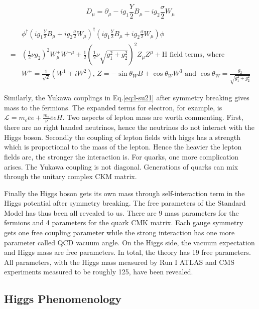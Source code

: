 \begin{equation}
 D_{\mu}  = \partial_{\mu}-ig_1\frac{Y}{2}B_{\mu} - ig_2\frac{\sigma}{2}W_{\mu}
  \label{eq:SU2U1D}
\end{equation}


\begin{equation}
  \begin{split}
   &\phi^{\dagger}(ig_1\frac{Y}{2}B_{\mu}+ig_2\frac{\sigma}{2}W_{\mu})^{\dagger} (ig_1\frac{Y}{2}B_{\mu}+ig_2\frac{\sigma}{2}W_{\mu}) \phi  \\
   =& (\frac{1}{2}\nu g_2)^2 W_{\mu}^+W^{-\mu} + \frac{1}{2}(\frac{1}{2}\nu \sqrt{g_1^2+g_2^2})^2 Z_{\mu}Z^{\mu} + \text{H field terms, where}\\
   &W^{\pm} = \frac{1}{\sqrt{2}}(W^1\mp iW^2) \text{, } Z = -\sin{\theta_W}B+\cos{\theta_W}W^3 \text{ and } \cos{\theta_W} = \frac{g_2}{\sqrt{g^2_1+g^2_2}}
  \end{split}
  \label{eq:SU2U1cov}
\end{equation}


Similarly, the Yukawa couplings in Eq.\ref{eq:l-su21} after symmetry breaking gives mass to the fermions. The expanded terms for electron, for example, is $\mathcal{L} = m_e\bar{e} e + \frac{m_{e}}{\nu}\bar{e}e H$. Two aspects of lepton mass are worth commenting. First, there are no right handed neutrinos, hence the neutrinos do not interact with the Higgs boson. Secondly the coupling of lepton fields with higgs has a strength which is proportional to the mass of the lepton. Hence the heavier the lepton fields are, the stronger the interaction is. For quarks, one more complication arises. The Yukawa coupling is not diagonal. Generations of quarks can mix through the unitary complex CKM matrix.

Finally the Higgs boson gets its own mass through self-interaction term in the Higgs potential after symmetry breaking. The free parameters of the Standard Model has thus been all revealed to us. There are 9 mass parameters for the fermions and 4 parameters for the quark CMK matrix. Each gauge symmetry gets one free coupling parameter while the strong interaction has one more parameter called QCD vacuum angle. On the Higgs side, the vacuum expectation and Higgs mass are free parameters. In total, the theory has 19 free parameters. All parameters, with the Higgs mass measured by Run I ATLAS and CMS experiments measured to be roughly 125, have been revealed. 


\subsection{Higgs Phenomenology}

